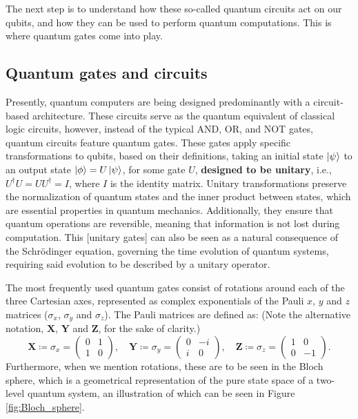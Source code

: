 The next step is to understand how these so-called quantum circuits act on our qubits, and how they can be used to perform quantum computations. This is where quantum gates come into play.




\subsection*{Quantum gates and circuits}
Presently, quantum computers are being designed predominantly with a circuit-based architecture. These circuits serve as the quantum equivalent of classical logic circuits, however, instead of the typical AND, OR, and NOT gates, quantum circuits feature quantum gates. These gates apply specific transformations to qubits, based on their definitions, taking an initial state $\ket{\psi}$ to an output state $\ket{\phi} = U\ket{\psi}$, for some gate $U$, \textbf{designed to be unitary}, i.e., $U^{\dagger}U = UU^{\dagger} = I$, where $I$ is the identity matrix. Unitary transformations preserve the normalization of quantum states and the inner product between states, which are essential properties in quantum mechanics. Additionally, they ensure that quantum operations are reversible, meaning that information is not lost during computation. This [unitary gates] can also be seen as a natural consequence of the Schrödinger equation, governing the time evolution of quantum systems, requiring said evolution to be described by a unitary operator.

The most frequently used quantum gates consist of rotations around each of the three Cartesian axes, represented as complex exponentials of the Pauli $x$, $y$ and $z$ matrices ($\sigma_x$, $\sigma_y$ and $\sigma_z$). The Pauli matrices are defined as: (Note the alternative notation, $\boldsymbol{X}$, $\boldsymbol{Y}$ and $\boldsymbol{Z}$, for the sake of clarity.)
\begin{equation}
  \boldsymbol{X} \coloneq \sigma_x =
  \begin{pmatrix}
    0 & 1 \\
    1 & 0
  \end{pmatrix},
  \quad
  \boldsymbol{Y} \coloneq \sigma_y =
  \begin{pmatrix}
    0 & -i \\
    i & 0
  \end{pmatrix},
  \quad
  \boldsymbol{Z} \coloneq \sigma_z =
  \begin{pmatrix}
    1 & 0 \\
    0 & -1
  \end{pmatrix}.
\end{equation}
Furthermore, when we mention rotations, these are to be seen in the Bloch sphere, which is a geometrical representation of the pure state space of a two-level quantum system, an illustration of which can be seen in Figure \ref{fig:Bloch_sphere}.


